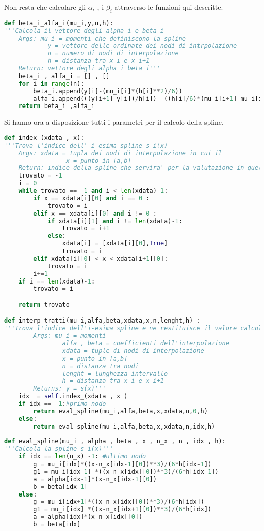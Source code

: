 \documentclass[a4paper,12pt]{report}
\theoremstyle{definition}
\begin{document}
Non resta che calcolare gli $\alpha_i$ , i $\beta_i$ attraverso le funzioni qui descritte.
\begin{lstlisting}[language=Python]
def beta_i_alfa_i(mu_i,y,n,h):
'''Calcola il vettore degli alpha_i e beta_i
	Args: mu_i = momenti che definiscono la spline
			y = vettore delle ordinate dei nodi di intrpolazione
			n = numero di nodi di interpolazione
			h = distanza tra x_i e x_i+1
	Return: vettore degli alpha_i beta_i'''
	beta_i , alfa_i = [] , []
	for i in range(n):
		beta_i.append(y[i]-(mu_i[i]*(h[i]**2)/6))
		alfa_i.append(((y[i+1]-y[i])/h[i]) -((h[i]/6)*(mu_i[i+1]-mu_i[i])))
	return beta_i ,alfa_i
\end{lstlisting}
Si hanno ora a disposizione tutti i parametri per il calcolo della spline.\\
\begin{lstlisting}[language=Python]
def index_(xdata , x):
'''Trova l'indice dell' i-esima spline s_i(x)
	Args: xdata = tupla dei nodi di interpolazione in cui il 							secondo elemento serve per la valutazione nei nodi di 			 raccordo e per stabilire a quale intervallo 								  appartiene il punto x
				 x = punto in [a,b]
	Return: indice della spline che servira' per la valutazione in quell'intervallo'''
	trovato = -1
	i = 0
	while trovato == -1 and i < len(xdata)-1:
		if x == xdata[i][0] and i == 0 :
			trovato = i
		elif x == xdata[i][0] and i != 0 :
			if xdata[i][1] and i != len(xdata)-1:
				trovato = i+1
			else:
				xdata[i] = [xdata[i][0],True]
				trovato = i
		elif xdata[i][0] < x < xdata[i+1][0]:
			trovato = i
		i+=1
	if i == len(xdata)-1:
		trovato = i

	return trovato 

def interp_tratti(mu_i,alfa,beta,xdata,x,n,lenght,h) :
'''Trova l'indice dell'i-esima spline e ne restituisce il valore calcolato nel punto x
		Args: mu_i = momenti
				alfa , beta = coefficienti dell'interpolazione
				xdata = tuple di nodi di interpolazione
				x = punto in [a,b]
				n = distanza tra nodi
				lenght = lunghezza intervallo
				h = distanza tra x_i e x_i+1
		Returns: y = s(x)'''
	idx  = self.index_(xdata , x )
	if idx == -1:#primo nodo
		return eval_spline(mu_i,alfa,beta,x,xdata,n,0,h)
	else:
		return eval_spline(mu_i,alfa,beta,x,xdata,n,idx,h)
		
def eval_spline(mu_i , alpha , beta , x , n_x , n , idx , h):
'''Calcola la spline s_i(x)'''
	if idx == len(n_x) -1: #ultimo nodo
		g = mu_i[idx]*((x-n_x[idx-1][0])**3)/(6*h[idx-1])
		g1 = mu_i[idx-1] *((x-n_x[idx][0])**3)/(6*h[idx-1])
		a = alpha[idx-1]*(x-n_x[idx-1][0])
		b = beta[idx-1]
	else:
		g = mu_i[idx+1]*((x-n_x[idx][0])**3)/(6*h[idx])
		g1 = mu_i[idx] *((x-n_x[idx+1][0])**3)/(6*h[idx])
		a = alpha[idx]*(x-n_x[idx][0])
		b = beta[idx]
		

\end{lstlisting}
\end{document}
